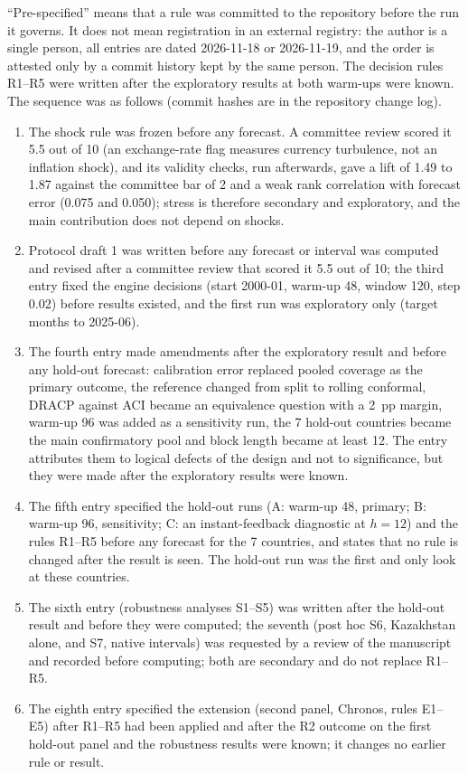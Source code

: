 ``Pre-specified'' means that a rule was committed to the repository before the run it governs. It does not mean registration in an external registry: the author is a single person, all entries are dated 2026-11-18 or 2026-11-19, and the order is attested only by a commit history kept by the same person. The decision rules R1--R5 were written after the exploratory results at both warm-ups were known. The sequence was as follows (commit hashes are in the repository change log).
\begin{enumerate}
\item The shock rule was frozen before any forecast. A committee review scored it 5.5 out of 10 (an exchange-rate flag measures currency turbulence, not an inflation shock), and its validity checks, run afterwards, gave a lift of 1.49 to 1.87 against the committee bar of 2 and a weak rank correlation with forecast error (0.075 and 0.050); stress is therefore secondary and exploratory, and the main contribution does not depend on shocks.
\item Protocol draft 1 was written before any forecast or interval was computed and revised after a committee review that scored it 5.5 out of 10; the third entry fixed the engine decisions (start 2000-01, warm-up 48, window 120, step 0.02) before results existed, and the first run was exploratory only (target months to 2025-06).
\item The fourth entry made amendments after the exploratory result and before any hold-out forecast: calibration error replaced pooled coverage as the primary outcome, the reference changed from split to rolling conformal, DRACP against ACI became an equivalence question with a 2~pp margin, warm-up 96 was added as a sensitivity run, the 7 hold-out countries became the main confirmatory pool and block length became at least 12. The entry attributes them to logical defects of the design and not to significance, but they were made after the exploratory results were known.
\item The fifth entry specified the hold-out runs (A: warm-up 48, primary; B: warm-up 96, sensitivity; C: an instant-feedback diagnostic at $h=12$) and the rules R1--R5 before any forecast for the 7 countries, and states that no rule is changed after the result is seen. The hold-out run was the first and only look at these countries.
\item The sixth entry (robustness analyses S1--S5) was written after the hold-out result and before they were computed; the seventh (post hoc S6, Kazakhstan alone, and S7, native intervals) was requested by a review of the manuscript and recorded before computing; both are secondary and do not replace R1--R5.
\item The eighth entry specified the extension (second panel, Chronos, rules E1--E5) after R1--R5 had been applied and after the R2 outcome on the first hold-out panel and the robustness results were known; it changes no earlier rule or result.
\end{enumerate}

